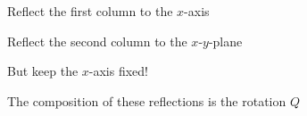 \documentclass[handout,aspect=169]{beamer}
\begin{document}
\begin{frame}
\begin{center}
Reflect the {\color{rot}first column} to the $x$-axis
\end{center}
\end{frame}

\begin{frame}
\begin{center}
Reflect the {\color{gruen}second column} to the $x$-$y$-plane
\end{center}
\end{frame}

\begin{frame}
\begin{center}
But keep the $x$-axis fixed!
\end{center}
\end{frame}

\begin{frame}
\begin{center}
The composition of these reflections is the rotation $Q$
\end{center}
\end{frame}
\end{document}
